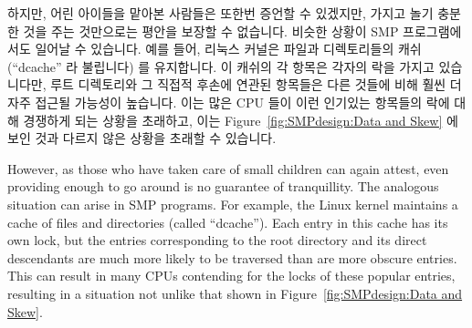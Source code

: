 

하지만, 어린 아이들을 맡아본 사람들은 또한번 증언할 수 있겠지만, 가지고 놀기
충분한 것을 주는 것만으로는 평안을 보장할 수 없습니다.
비슷한 상황이 SMP 프로그램에서도 일어날 수 있습니다.
예를 들어, 리눅스 커널은 파일과 디렉토리들의 캐쉬 (``dcache'' 라 불립니다) 를
유지합니다.
이 캐쉬의 각 항목은 각자의 락을 가지고 있습니다만, 루트 디렉토리와 그 직접적
후손에 연관된 항목들은 다른 것들에 비해 훨씬 더 자주 접근될 가능성이 높습니다.
이는 많은 CPU 들이 이런 인기있는 항목들의 락에 대해 경쟁하게 되는 상황을
초래하고, 이는
Figure~\ref{fig:SMPdesign:Data and Skew} 에 보인 것과 다르지 않은 상황을 초래할
수 있습니다.

\iffalse

However, as those who have taken care of small children can again attest,
even providing enough to go around is no guarantee of tranquillity.
The analogous situation can arise in SMP programs.
For example, the Linux kernel maintains a cache of files and directories
(called ``dcache'').
Each entry in this cache has its own lock, but the entries corresponding
to the root directory and its direct descendants are much more likely to
be traversed than are more obscure entries.
This can result in many CPUs contending for the locks of these popular
entries, resulting in a situation not unlike that
shown in Figure~\ref{fig:SMPdesign:Data and Skew}.

